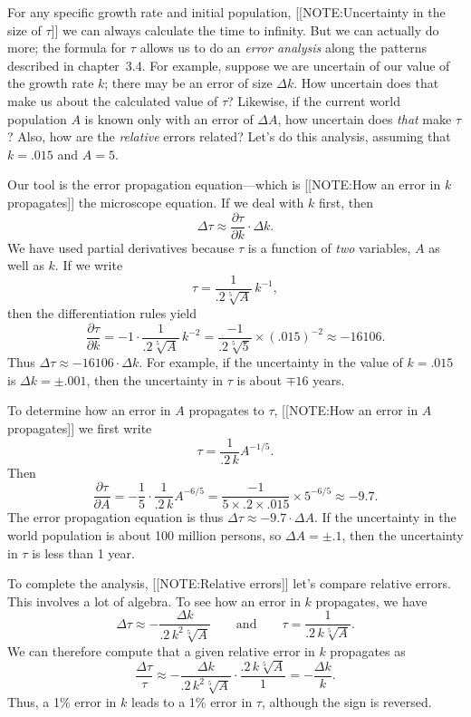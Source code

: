 \label{supergrowth errors-begin}
For any specific growth rate and initial population, 
[[NOTE:Uncertainty in  the size of $\tau$]]
we can always calculate the time to infinity.  But we can actually do
more; the formula for $\tau$ allows us to do an {\em error
  analysis\/} along the patterns described in
chapter~3.4.  For example, suppose we are uncertain of our value of
the growth rate $k$; there may be an error of size $\Delta k$.  How
uncertain does that make us about the calculated value of $\tau$?
Likewise, if the current world population $A$ is known only with an
error of $\Delta A$, how uncertain does {\em that\/} make $\tau$?
Also, how are the {\em relative\/} errors related?  Let's do this
analysis, assuming that $k = .015$ and $A = 5$.

	Our tool is the error propagation equation---which is 
	[[NOTE:How an error in $k$ propagates]]
the microscope equation.  If we deal with $k$ first, then
	\[
\Delta \tau \approx \dfrac{\partial \tau}{\partial k}
		\cdot \Delta k.
\]
We have used partial derivatives because $\tau$ is a function of {\em two\/} variables, $A$ as well as $k$.  If we write
	\[
\tau = \dfrac{1}{.2\sqrt[5]{A}} \, k^{-1},
\]
then the differentiation rules yield
	\[
\dfrac{\partial \tau}{\partial k} = -1 \cdot 
		\dfrac{1}{.2\sqrt[5]{A}} \, k^{-2} = 
		\dfrac{-1}{.2\sqrt[5]{5}} \times (.015)^{-2} 
		\approx -16106.
\]
Thus $\Delta \tau \approx -16106 \cdot \Delta k$.  For example, if the uncertainty in the value of $k = .015$ is $\Delta k = \pm .001$, then the uncertainty in $\tau$ is about $\mp 16$ years.

	To determine how an error in $A$ propagates to $\tau$, 
	[[NOTE:How an error in $A$ propagates]]
we first write
	\[
\tau = \dfrac{1}{.2\,k} A^{-1/5}.
\]
Then
	\[
\dfrac{\partial \tau}{\partial A} = 
		-\dfrac{1}{5} \cdot \dfrac{1}{.2\,k} A^{-6/5} = 
		\dfrac{-1}{5 \times.2 \times .015} \times 5^{-6/5} 
		\approx -9.7.
\]
The error propagation equation is thus $\Delta \tau \approx -9.7 \cdot \Delta A$.  If the uncertainty in the world population is about 100 million persons, so $\Delta A = \pm .1$, then the uncertainty in $\tau$ is less than 1 year.

	To complete the analysis, 
	[[NOTE:Relative errors]]
let's compare relative errors.  This involves a lot of algebra.  To see how an error in $k$ propagates, we have
	\[
\Delta \tau \approx -\dfrac{\Delta k}{.2\,k^2\sqrt[5]{A}}
		\qquad \mbox{and} \qquad 
		\tau = \dfrac{1}{.2\,k\sqrt[5]{A}}.
\]
We can therefore compute that a given relative error in $k$ propagates as 
	\[
\dfrac{\Delta \tau}{\tau} \approx 
		-\dfrac{\Delta k}{.2\,k^2\sqrt[5]{A}} \cdot
			\dfrac{.2\,k\sqrt[5]{A}}{1} 
		= -\dfrac{\Delta k}{k}.
\]
Thus, a 1\% error in $k$ leads to a 1\% error in $\tau$, although the sign is reversed.

